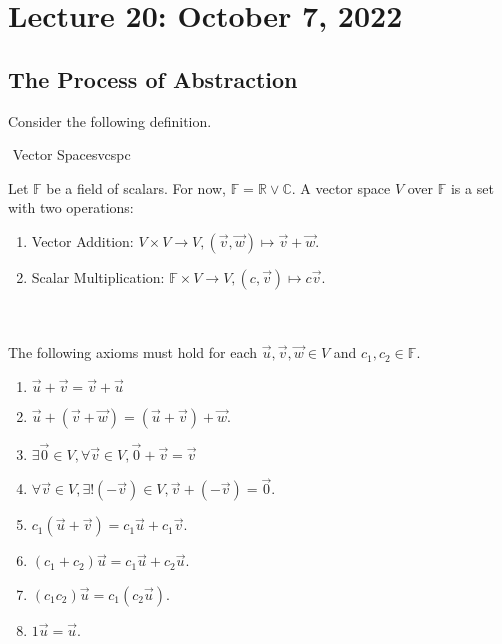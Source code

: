 \section{Lecture 20: October 7, 2022}

    \subsection{The Process of Abstraction}

        Consider the following definition.
        \begin{definition}{\Stop\,\,Vector Spaces}{vcspc}

            Let \(\mathbb{F}\) be a field of scalars. For now, \(\mathbb{F}=\mathbb{R}\vee\mathbb{C}\). A vector space \(V\) over \(\mathbb{F}\) is a set with two operations: 
            \begin{enumerate}
                \item Vector Addition: \(V\times V\to V, (\vec{v},\vec{w})\mapsto \vec{v}+\vec{w}\).
                \item Scalar Multiplication: \(\mathbb{F}\times V\to V, (c,\vec{v})\mapsto c\vec{v}\).
            \end{enumerate}
            \vphantom
            \\
            \\
            The following axioms must hold for each \(\vec{u},\vec{v},\vec{w}\in V\) and \(c_1,c_2\in\mathbb{F}\).
            \begin{enumerate}
                \item \(\vec{u}+\vec{v}=\vec{v}+\vec{u}\)
                \item \(\vec{u}+(\vec{v}+\vec{w})=(\vec{u}+\vec{v})+\vec{w}\).
                \item \(\exists \vec{0}\in V, \forall \vec{v}\in V, \vec{0}+\vec{v}=\vec{v}\)
                \item \(\forall \vec{v}\in V, \exists! (-\vec{v})\in V, \vec{v}+(-\vec{v})=\vec{0}\).
                \item \(c_1(\vec{u}+\vec{v})=c_1\vec{u}+c_1\vec{v}\).
                \item \((c_1+c_2)\vec{u}=c_1\vec{u}+c_2\vec{u}\).
                \item \((c_1c_2)\vec{u}=c_1(c_2\vec{u})\).
                \item \(1\vec{u}=\vec{u}\).
            \end{enumerate}
            
        \end{definition}
